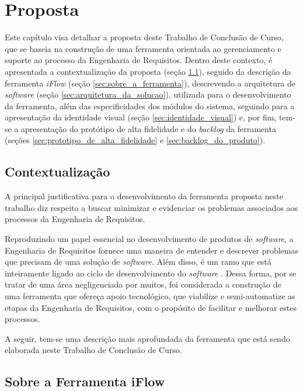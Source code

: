 \chapter[Proposta]{Proposta}

\label{chap:proposta}

Este capítulo visa detalhar a proposta deste Trabalho de Conclusão de Curso, que se baseia na construção de uma ferramenta orientada ao gerenciamento e suporte ao processo da Engenharia de Requisitos. Dentro deste contexto, é apresentada a contextualização da proposta (seção \ref{sec:contextualizacao}), seguido da descrição da ferramenta \textit{iFlow} (seção \ref{sec:sobre_a_ferramenta}), descrevendo a arquitetura de \textit{software} (seção \ref{sec:arquitetura_da_solucao}), utilizada para o desenvolvimento da ferramenta, além das especificidades dos módulos do sistema, seguindo para a apresentação da identidade visual (seção \ref{sec:identidade_visual}) e, por fim, tem-se a apresentação do protótipo de alta fidelidade e do \textit{backlog} da ferramenta (seções \ref{sec:prototipo_de_alta_fidelidade} e \ref{sec:backlog_do_produto}).

\section{Contextualização}

\label{sec:contextualizacao}

A principal justificativa para o desenvolvimento da ferramenta proposta neste trabalho diz respeito a buscar minimizar e evidenciar os problemas associados aos processos da Engenharia de Requisitos.

Reproduzindo um papel essencial no desenvolvimento de produtos de \textit{software}, a Engenharia de Requisitos fornece uma maneira de entender e descrever problemas que precisam de uma solução de \textit{software}. Além disso, é um ramo que está inteiramente ligado ao ciclo de desenvolvimento do \textit{software} \cite{elliott2012software}. Dessa forma, por se tratar de uma área negligenciada por muitos, foi considerada a construção de uma ferramenta que ofereça apoio tecnológico, que viabilize e semi-automatize as etapas da Engenharia de Requisitos, com o propósito de facilitar e melhorar estes processos.

A seguir, tem-se uma descrição mais aprofundada da ferramenta que está sendo elaborada neste Trabalho de Conclusão de Curso.

\section{Sobre a Ferramenta iFlow}


